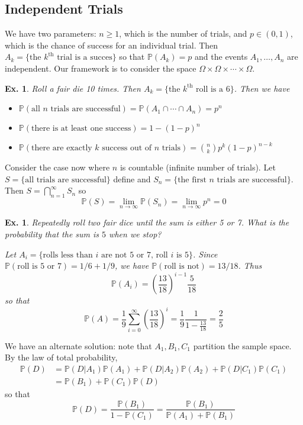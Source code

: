 \documentclass[12pt, a4paper]{book}
\renewcommand{\Pr}{\mathbb{P}}
\newtheorem{example}[theorem]{Ex.}
\theoremstyle{nonumberplain}
\begin{document}
\subsection{Independent Trials}
We have two parameters: $n\geq 1$, which is the number of trials, and $p\in(0,1)$, which is the chance of success for an individual trial.
Then $A_k=\{\text{the $k^\text{th}$ trial is a succes}\}$ so that $\Pr(A_k)=p$ and the events $A_1,\ldots,A_n$ are independent.
Our framework is to consider the space $\Omega\times\Omega\times\cdots\times\Omega$.
\begin{example}
    Roll a fair die 10 times.
    Then $A_k=\{\text{the $k^\text{th}$ roll is a 6}\}$.
    Then we have
    \begin{itemize}
        \item $\Pr(\text{all $n$ trials are successful})=\Pr(A_1\cap \cdots\cap A_n)=p^n$
        \item $\Pr(\text{there is at least one success})=1-(1-p)^n$
        \item $\Pr(\text{there are exactly $k$ success out of $n$ trials})=\binom{n}{k}p^k(1-p)^{n-k}$
    \end{itemize}
\end{example}
Consider the case now where $n$ is countable (infinite number of trials).
Let $S=\{\text{all trials are successful}\}$ define and $S_n=\{\text{the first $n$ trials are successful}\}$.
Then $S=\bigcap\limits_{n=1}^\infty S_n$ so
\[\Pr(S)=\lim_{n\to\infty}\Pr(S_n)=\lim_{n\to\infty}p^n=0\]
\begin{example}
    Repeatedly roll two fair dice until the sum is either 5 or 7.
    What is the probability that the sum is $5$ when we stop?

    Let $A_i=\{\text{rolls less than $i$ are not 5 or 7, roll $i$ is 5}\}$.
    Since $\Pr(\text{roll is 5 or 7})=1/6+1/9$, we have $\Pr(\text{roll is not})=13/18$.
    Thus
    \[\Pr(A_i)=\left(\frac{13}{18}\right)^{i-1}\frac{5}{18}\]
    so that
    \[\Pr(A)=\frac{1}{9}\sum\limits_{i=0}^\infty\left(\frac{13}{18}\right)^i=\frac{1}{9}\frac{1}{1-\frac{13}{18}}=\frac{2}{5}\]
\end{example}
We have an alternate solution: note that $A_1,B_1,C_1$ partition the sample space.
By the law of total probability,
\begin{align*}
    \Pr(D)&=\Pr(D|A_1)\Pr(A_1)+\Pr(D|A_2)\Pr(A_2)+\Pr(D|C_1)\Pr(C_1)\\
          &= \Pr(B_1)+\Pr(C_1)\Pr(D)
\end{align*}
so that
\[\Pr(D)=\frac{\Pr(B_1)}{1-\Pr(C_1)}=\frac{\Pr(B_1)}{\Pr(A_1)+\Pr(B_1)}\]
\end{document}
